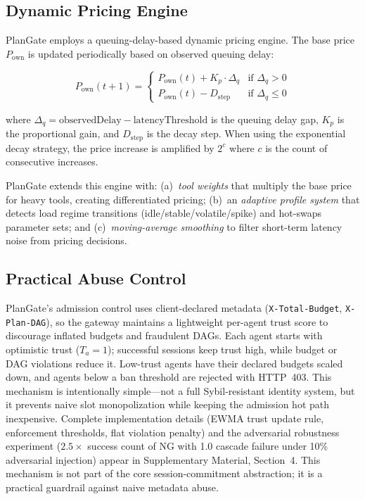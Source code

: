 \documentclass[sigconf,review,anonymous]{acmart}
\begin{document}
\subsection{Dynamic Pricing Engine}

PlanGate employs a queuing-delay-based dynamic pricing engine. The base price $P_{\text{own}}$ is updated periodically based on observed queuing delay:

\begin{equation}
P_{\text{own}}(t+1) = \begin{cases}
P_{\text{own}}(t) + K_p \cdot \Delta_q & \text{if } \Delta_q > 0 \\
P_{\text{own}}(t) - D_{\text{step}} & \text{if } \Delta_q \leq 0
\end{cases}
\end{equation}

\noindent where $\Delta_q = \text{observedDelay} - \text{latencyThreshold}$ is the queuing delay gap, $K_p$ is the proportional gain, and $D_{\text{step}}$ is the decay step. When using the exponential decay strategy, the price increase is amplified by $2^{c}$ where $c$ is the count of consecutive increases.


PlanGate extends this engine with: (a)~\emph{tool weights} that multiply the base price for heavy tools, creating differentiated pricing; (b)~an \emph{adaptive profile system} that detects load regime transitions (idle/stable/volatile/spike) and hot-swaps parameter sets; and (c)~\emph{moving-average smoothing} to filter short-term latency noise from pricing decisions.

\subsection{Practical Abuse Control}
\label{sec:abuse-control}

PlanGate's admission control uses client-declared metadata (\texttt{X-Total-Budget}, \texttt{X-Plan-DAG}), so the gateway maintains a lightweight per-agent trust score to discourage inflated budgets and fraudulent DAGs. Each agent starts with optimistic trust ($T_a{=}1$); successful sessions keep trust high, while budget or DAG violations reduce it. Low-trust agents have their declared budgets scaled down, and agents below a ban threshold are rejected with HTTP~403. This mechanism is intentionally simple---not a full Sybil-resistant identity system, but it prevents naive slot monopolization while keeping the admission hot path inexpensive. Complete implementation details (EWMA trust update rule, enforcement thresholds, flat violation penalty) and the adversarial robustness experiment ($2.5\times$ success count of NG with 1.0 cascade failure under 10\% adversarial injection) appear in Supplementary Material, Section~4. This mechanism is not part of the core session-commitment abstraction; it is a practical guardrail against naive metadata abuse.
\end{document}
